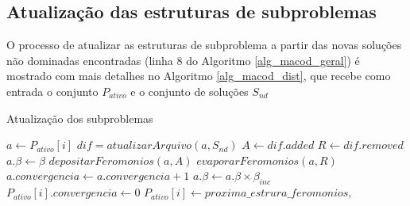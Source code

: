 \subsection{Atualização das estruturas de subproblemas}

O processo de atualizar as estruturas de subproblema a partir das novas soluções não dominadas encontradas (linha 8 do Algoritmo \ref{alg_macod_geral}) é mostrado com mais detalhes no Algoritmo \ref{alg_macod_dist}, que recebe como entrada o conjunto $P_{ativo}$ e o conjunto de soluções $S_{nd}$

\begin{algorithm}[!htbp]
	\caption{Atualização dos subproblemas}
	\label{alg_macod_dist}
	\begin{algorithmic}[1]
		\State $a \gets P_{ativo}[i]$
		\State $dif = atualizarArquivo(a, S_{nd})$
		\State $A \gets dif.added$
		\State $R \gets dif.removed$
		\State $a.\beta \gets \beta$
		\State $depositarFeromonios(a, A)$
		\State $evaporarFeromonios(a, R)$
		\Else
		\State $a.convergencia \gets a.convergencia + 1$
		\State $a.\beta \gets a.\beta \times \beta_{inc}$
		\State $P_{ativo}[i].convergencia \gets 0$
		\State $P_{ativo}[i] \gets proxima\_estrura\_feromonios$,
		\EndIf
		\EndIf
		\EndFor
	\end{algorithmic}
\end{algorithm}

